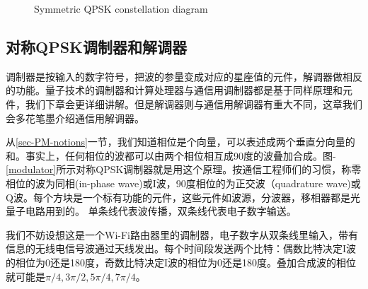 \documentclass{ctexbook}
\begin{document}
\begin{figure}[H]\label{sQPSK}
\caption{Symmetric QPSK constellation diagram}
\end{figure}

\subsection{对称QPSK调制器和解调器}\label{Sec-demodulator}
调制器是按输入的数字符号，把波的参量变成对应的星座值的元件，解调器做相反的功能。量子技术的调制器和计算处理器与通信用调制器都是基于同样原理和元件，我们下章会更详细讲解。但是解调器则与通信用解调器有重大不同，这章我们会多花笔墨介绍通信用解调器。

从\ref{sec-PM-notions}一节，我们知道相位是个向量，可以表述成两个垂直分向量的和。事实上，任何相位的波都可以由两个相位相互成90度的波叠加合成。图-\ref{modulator}所示对称QPSK调制器就是用这个原理。按通信工程师们的习惯，称零相位的波为同相(in-phase wave)或I波，90度相位的为正交波（quadrature wave)或Q波。每个方块是一个标有功能的元件，这些元件如波源，分波器，移相器都是光量子电路用到的。
单条线代表波传播，双条线代表电子数字输送。

我们不妨设想这是一个Wi-Fi路由器里的调制器，电子数字从双条线里输入，带有信息的无线电信号波通过天线发出。每个时间段发送两个比特：偶数比特决定I波的相位为0还是180度，奇数比特决定I波的相位为0还是180度。叠加合成波的相位就可能是$\pi/4, 3\pi/2, 5\pi/4, 7\pi/4$。
\end{document}
